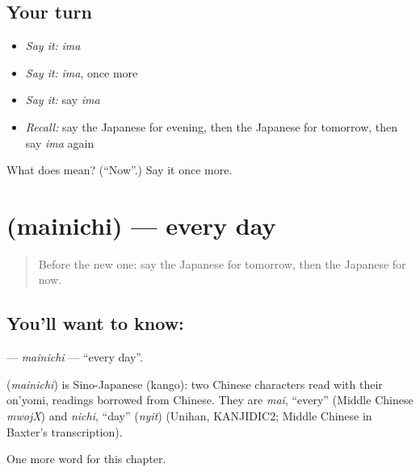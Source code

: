 \subsection*{Your turn}
\begin{itemize}
\raggedright
  \item \emph{Say it:} \emph{ima}
  \item \emph{Say it:} \emph{ima}, once more
  \item \emph{Say it:} say \emph{ima}
  \item \emph{Recall:} say the Japanese for evening, then the Japanese for tomorrow, then say \emph{ima} again
\end{itemize}

\begin{tcolorbox}[breakable,colback=teal!4,colframe=teal!35!black,title={Before you move on}]
What does  mean? (\textquotedblleft{}Now\textquotedblright{}.) Say it once more.
\end{tcolorbox}
\section[\texorpdfstring{\ja{まいにち} (mainichi)}{まいにち (mainichi)}]{ (mainichi) — every day}

\label{lesson:JA-C54-mainichi}



\begin{quote}
Before the new one: say the Japanese for tomorrow, then the Japanese for now.
\end{quote}

\subsection*{You'll want to know: }
\textbf{} — \emph{mainichi} — \textquotedblleft{}every day\textquotedblright{}.

\begin{cousinweb}
\textbf{} (\emph{mainichi}) is Sino-Japanese (kango): two Chinese characters read with their on'yomi, readings borrowed from Chinese. They are \emph{mai}, \textquotedblleft{}every\textquotedblright{} (Middle Chinese \emph{mwojX}) and \emph{nichi}, \textquotedblleft{}day\textquotedblright{} (\emph{nyit}) (Unihan, KANJIDIC2; Middle Chinese in Baxter's transcription).
\end{cousinweb}

\begin{grammarlens}[title={What you've built}]
One more word for this chapter.
\end{grammarlens}

